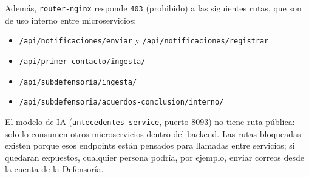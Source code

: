 Además, \texttt{router-nginx} responde \texttt{403} (prohibido) a las siguientes rutas, que son de uso interno entre microservicios:
\begin{itemize}
  \item \nolinkurl{/api/notificaciones/enviar} y \nolinkurl{/api/notificaciones/registrar}
  \item \nolinkurl{/api/primer-contacto/ingesta/}
  \item \nolinkurl{/api/subdefensoria/ingesta/}
  \item \nolinkurl{/api/subdefensoria/acuerdos-conclusion/interno/}
\end{itemize}

El modelo de IA (\texttt{antecedentes-service}, puerto 8093) no tiene ruta pública: solo lo consumen otros microservicios dentro del backend. Las rutas bloqueadas existen porque esos endpoints están pensados para llamadas entre servicios; si quedaran expuestos, cualquier persona podría, por ejemplo, enviar correos desde la cuenta de la Defensoría.
